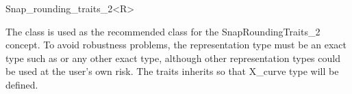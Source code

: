 
\ccRefPageBegin


\begin {ccRefClass} {Snap_rounding_traits_2<R>}
    
    The class 
    is used as the recommended class for the SnapRoundingTraits\_2 concept.
    To avoid robustness problems, 
    the representation type  must be an exact type such as
     or any other exact type,
    although other representation types could be used at the user's own risk.
    The traits inherits  so that
    X\_curve type will be defined.

 
\ccIsModel
    \\
 
\end{ccRefClass} %
\ccRefPageEnd
